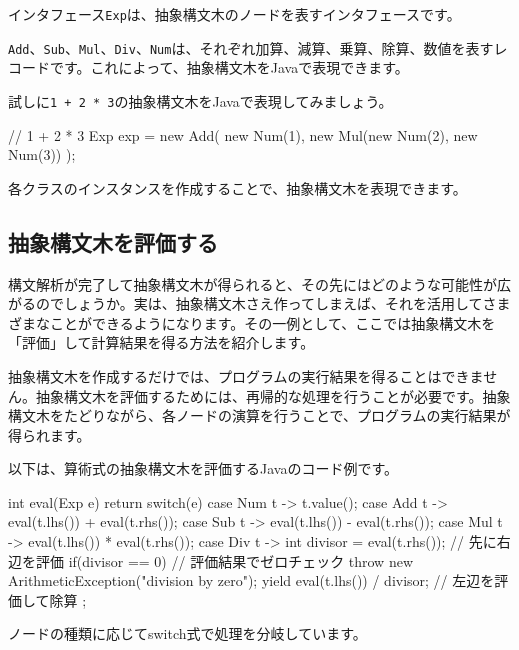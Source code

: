 インタフェース\texttt{Exp}は、抽象構文木のノードを表すインタフェースです。

\texttt{Add}、\texttt{Sub}、\texttt{Mul}、\texttt{Div}、\texttt{Num}は、それぞれ加算、減算、乗算、除算、数値を表すレコードです。これによって、抽象構文木をJavaで表現できます。

試しに\texttt{1\ +\ 2\ *\ 3}の抽象構文木をJavaで表現してみましょう。

\begin{codescreen}{}
// 1 + 2 * 3
Exp exp = new Add(
  new Num(1), new Mul(new Num(2), new Num(3))
);
\end{codescreen}

各クラスのインスタンスを作成することで、抽象構文木を表現できます。

\subsection{抽象構文木を評価する}

構文解析が完了して抽象構文木が得られると、その先にはどのような可能性が広がるのでしょうか。実は、抽象構文木さえ作ってしまえば、それを活用してさまざまなことができるようになります。その一例として、ここでは抽象構文木を「評価」して計算結果を得る方法を紹介します。

抽象構文木を作成するだけでは、プログラムの実行結果を得ることはできません。抽象構文木を評価するためには、再帰的な処理を行うことが必要です。抽象構文木をたどりながら、各ノードの演算を行うことで、プログラムの実行結果が得られます。

以下は、算術式の抽象構文木を評価するJavaのコード例です。

\begin{codescreen}{}
int eval(Exp e) {
  return switch(e){
    case Num t -> t.value();
    case Add t -> eval(t.lhs()) + eval(t.rhs());
    case Sub t -> eval(t.lhs()) - eval(t.rhs());
    case Mul t -> eval(t.lhs()) * eval(t.rhs());
    case Div t -> {
      int divisor = eval(t.rhs()); // 先に右辺を評価
      if(divisor == 0) { // 評価結果でゼロチェック
        throw new ArithmeticException("division by zero");
      }
      yield eval(t.lhs()) / divisor; // 左辺を評価して除算
    }
  };
}
\end{codescreen}

ノードの種類に応じてswitch式で処理を分岐しています。

